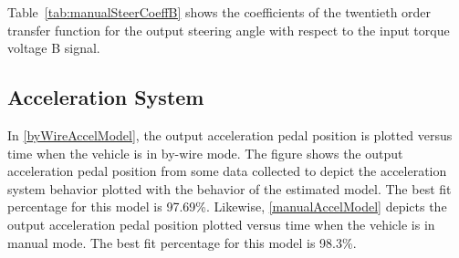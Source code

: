\documentclass[journal,twoside,web]{ieeecolor}
\begin{document}
\noindent Table~\ref{tab:manualSteerCoeffB} shows the coefficients of
the twentieth order transfer function for the output steering angle with respect
to the input torque voltage B signal. %
%
\begin{table}[hbtp]
	\caption{Manual Mode Steering Transfer Function Torque Voltage B Coefficient Table}
	\label{tab:manualSteerCoeffB}
  \centering
	\begin{center}
	\end{center}	
\end{table}
%

\subsection{Acceleration System}
In \autoref{byWireAccelModel}, the output acceleration pedal position is plotted versus time when the vehicle is in by-wire mode. The figure shows the output acceleration pedal position from some data collected to depict the acceleration system behavior plotted with the behavior of the estimated model. The best fit percentage for this model is 97.69\%. Likewise, \autoref{manualAccelModel} depicts the output acceleration pedal position plotted versus time when the vehicle is in manual mode. The best fit percentage for this model is 98.3\%. 
\end{document}
